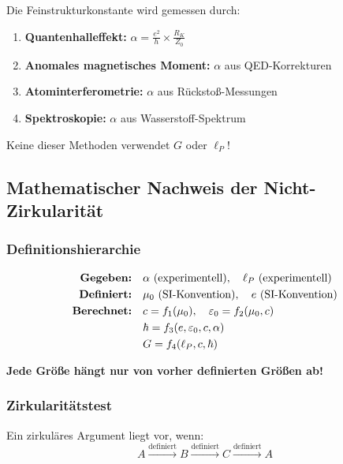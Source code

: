 \documentclass[12pt,a4paper]{article}
\theoremstyle{definition}
\begin{document}
	Die Feinstrukturkonstante wird gemessen durch:
	
	\begin{enumerate}
		\item \textbf{Quantenhalleffekt:} $\alpha = \frac{e^2}{h} \times \frac{R_K}{Z_0}$
		\item \textbf{Anomales magnetisches Moment:} $\alpha$ aus QED-Korrekturen
		\item \textbf{Atominterferometrie:} $\alpha$ aus R\"ucksto\ss{}-Messungen
		\item \textbf{Spektroskopie:} $\alpha$ aus Wasserstoff-Spektrum
	\end{enumerate}
	
	Keine dieser Methoden verwendet $G$ oder $\ell_P$!
	
	\subsection{Mathematischer Nachweis der Nicht-Zirkularit\"at}
	
	\subsubsection{Definitionshierarchie}
	
	\begin{align}
		\text{\textbf{Gegeben:}} &\quad \alpha \text{ (experimentell)}, \quad \ell_P \text{ (experimentell)}\\
		\text{\textbf{Definiert:}} &\quad \mu_0 \text{ (SI-Konvention)}, \quad e \text{ (SI-Konvention)}\\
		\text{\textbf{Berechnet:}} &\quad c = f_1(\mu_0), \quad \varepsilon_0 = f_2(\mu_0, c)\\
		&\quad \hbar = f_3(e, \varepsilon_0, c, \alpha)\\
		&\quad G = f_4(\ell_P, c, \hbar)
	\end{align}
	
	\textbf{Jede Gr\"o\ss{}e h\"angt nur von vorher definierten Gr\"o\ss{}en ab!}
	
	\subsubsection{Zirkularit\"atstest}
	
	Ein zirkul\"ares Argument liegt vor, wenn:
	\begin{equation}
		A \xrightarrow{\text{definiert}} B \xrightarrow{\text{definiert}} C \xrightarrow{\text{definiert}} A
	\end{equation}
	
\end{document}

